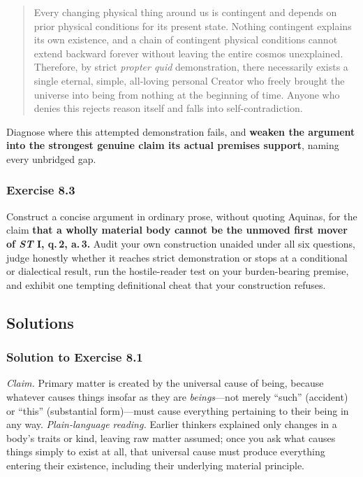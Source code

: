 \begin{quote}
Every changing physical thing around us is contingent and depends on prior physical conditions for its present state. Nothing contingent explains its own existence, and a chain of contingent physical conditions cannot extend backward forever without leaving the entire cosmos unexplained. Therefore, by strict \emph{propter quid} demonstration, there necessarily exists a single eternal, simple, all-loving personal Creator who freely brought the universe into being from nothing at the beginning of time. Anyone who denies this rejects reason itself and falls into self-contradiction.
\end{quote}

Diagnose where this attempted demonstration fails, and \textbf{weaken the argument into the strongest genuine claim its actual premises support}, naming every unbridged gap.

\subsubsection*{Exercise 8.3}
Construct a concise argument in ordinary prose, without quoting Aquinas, for the claim \textbf{that a wholly material body cannot be the unmoved first mover of \emph{ST} I, q.\,2, a.\,3.} Audit your own construction unaided under all six questions, judge honestly whether it reaches strict demonstration or stops at a conditional or dialectical result, run the hostile-reader test on your burden-bearing premise, and exhibit one tempting definitional cheat that your construction refuses.

\subsection{Solutions}

\subsubsection*{Solution to Exercise 8.1}
\emph{Claim.} Primary matter is created by the universal cause of being, because whatever causes things insofar as they are \emph{beings}---not merely ``such'' (accident) or ``this'' (substantial form)---must cause everything pertaining to their being in any way. \emph{Plain-language reading.} Earlier thinkers explained only changes in a body's traits or kind, leaving raw matter assumed; once you ask what causes things simply to exist at all, that universal cause must produce everything entering their existence, including their underlying material principle.

